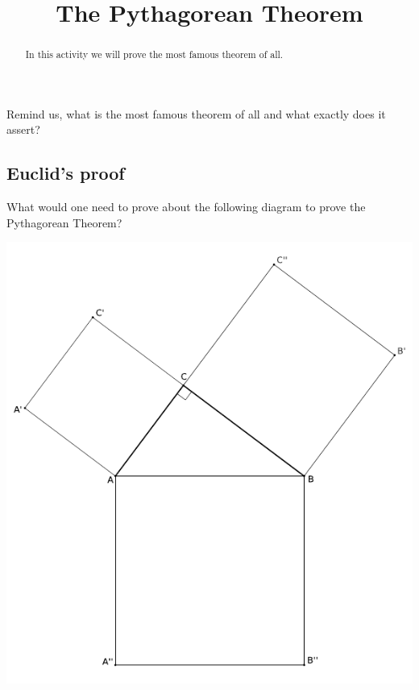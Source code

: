 \documentclass{ximera}
\title{The Pythagorean Theorem}
\begin{document}
\begin{abstract}
In this activity we will prove the most famous theorem of
  all.
\end{abstract}
\maketitle



\begin{question}
Remind us, what is the most famous theorem of all and what exactly
does it assert?
\end{question}


\subsection*{Euclid's proof}


\begin{question} 
What would one need to prove about the following diagram to prove the
Pythagorean Theorem?
\begin{image}
\includegraphics{EuclidAndGeometry/thePythagoreanTheorem/PythEuclid.pdf}
\end{image}
\end{question}
\end{document}
